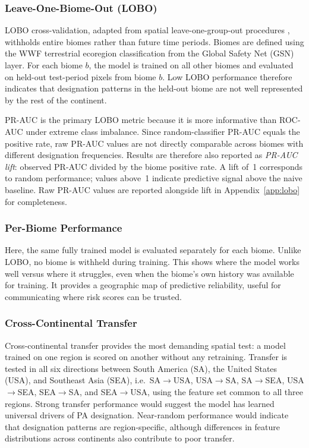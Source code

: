 \documentclass[12pt]{article}
\theoremstyle{break}
\begin{document}
\subsubsection{Leave-One-Biome-Out (LOBO)}
\label{sec:lobo}
LOBO cross-validation, adapted from spatial leave-one-group-out procedures
\citep{ploton2020, roberts2017}, withholds entire biomes rather than future time
periods. Biomes are defined using the WWF terrestrial ecoregion classification from
the Global Safety Net (GSN) layer. For each biome $b$, the model is trained on all
other biomes and evaluated on held-out test-period pixels from biome $b$. Low LOBO
performance therefore indicates that designation patterns in the held-out biome are
not well represented by the rest of the continent.

PR-AUC is the primary LOBO metric because it is more informative than ROC-AUC under
extreme class imbalance. Since random-classifier PR-AUC equals the positive rate,
raw PR-AUC values are not directly comparable across biomes with different
designation frequencies. Results are therefore also reported as \emph{PR-AUC lift}:
observed PR-AUC divided by the biome positive rate. A lift of~1 corresponds to random
performance; values above~1 indicate predictive signal above the naive baseline.
Raw PR-AUC values are reported alongside lift in Appendix~\ref{app:lobo} for
completeness.

\subsubsection{Per-Biome Performance}
\label{sec:cv2}
Here, the same fully trained model is evaluated separately for each biome. Unlike
LOBO, no biome is withheld during training. This shows where the model works well
versus where it struggles, even when the biome's own history was available for
training. It provides a geographic map of predictive reliability, useful for
communicating where risk scores can be trusted. 

\subsubsection{Cross-Continental Transfer}
\label{sec:cv3}
Cross-continental transfer provides the most demanding spatial test: a model trained
on one region is scored on another without any retraining. Transfer is tested in
all six directions between South America (SA), the United States (USA), and Southeast
Asia (SEA), i.e.\ SA$\to$USA, USA$\to$SA, SA$\to$SEA, USA$\to$SEA, SEA$\to$SA,
and SEA$\to$USA, using the feature set common to all three regions. Strong transfer
performance would suggest the model has learned universal drivers of PA designation.
Near-random performance would indicate that designation patterns are region-specific,
although differences in feature distributions across continents also contribute to
poor transfer.
\end{document}
